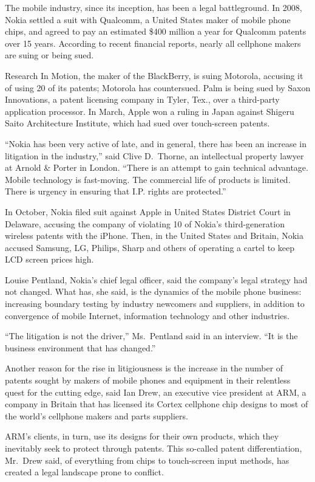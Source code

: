 ﻿\documentclass[12pt]{article}
\begin{document}
The mobile industry, since its inception, has been a legal battleground. In 2008, Nokia settled a
suit with Qualcomm, a United States maker of mobile phone chips, and agreed to pay an estimated
\$400 million a year for Qualcomm patents over 15 years. According to recent financial reports,
nearly all cellphone makers are suing or being sued.

Research In Motion, the maker of the BlackBerry, is suing Motorola, accusing it of using 20 of its
patents; Motorola has countersued. Palm is being sued by Saxon Innovations, a patent licensing
company in Tyler, Tex., over a third-party application processor. In March, Apple won a ruling in
Japan against Shigeru Saito Architecture Institute, which had sued over touch-screen patents.

``Nokia has been very active of late, and in general, there has been an increase in litigation in
the industry,'' said Clive D.~Thorne, an intellectual property lawyer at Arnold \& Porter in London.
``There is an attempt to gain technical advantage. Mobile technology is fast-moving. The commercial
life of products is limited. There is urgency in ensuring that I.P. rights are protected.''

In October, Nokia filed suit against Apple in United States District Court in Delaware, accusing the
company of violating 10 of Nokia's third-generation wireless patents with the iPhone. Then, in the
United States and Britain, Nokia accused Samsung, LG, Philips, Sharp and others of operating a
cartel to keep LCD screen prices high.

Louise Pentland, Nokia's chief legal officer, said the company's legal strategy had not changed.
What has, she said, is the dynamics of the mobile phone business: increasing boundary testing by
industry newcomers and suppliers, in addition to convergence of mobile Internet, information
technology and other industries.

``The litigation is not the driver,'' Ms.~Pentland said in an interview. ``It is the business
environment that has changed.''

Another reason for the rise in litigiousness is the increase in the number of patents sought by
makers of mobile phones and equipment in their relentless quest for the cutting edge, said Ian Drew,
an executive vice president at ARM, a company in Britain that has licensed its Cortex cellphone chip
designs to most of the world's cellphone makers and parts suppliers.

ARM's clients, in turn, use its designs for their own products, which they inevitably seek to
protect through patents. This so-called patent differentiation, Mr.~Drew said, of everything from
chips to touch-screen input methods, has created a legal landscape prone to conflict.
\end{document}
